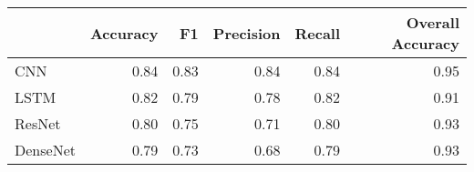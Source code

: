 \begin{tabular}{lrrrrr}
\toprule
{} &  Accuracy &    F1 &  Precision &  Recall &  Overall Accuracy \\
\midrule
CNN      &      0.84 &  0.83 &       0.84 &    0.84 &              0.95 \\
LSTM     &      0.82 &  0.79 &       0.78 &    0.82 &              0.91 \\
ResNet   &      0.80 &  0.75 &       0.71 &    0.80 &              0.93 \\
DenseNet &      0.79 &  0.73 &       0.68 &    0.79 &              0.93 \\
\bottomrule
\end{tabular}
